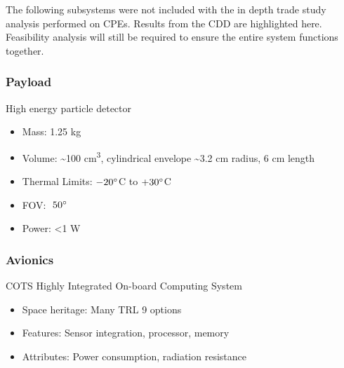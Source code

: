 The following subsystems were not included with the in depth trade study analysis performed on CPEs.  Results from the CDD are highlighted here.  Feasibility analysis will still be required to ensure the entire system functions together.

\subsubsection{Payload} High energy particle detector
\begin{itemize}
    \item Mass: 1.25 kg
    \item Volume: \textasciitilde100 cm\textsuperscript{3}, cylindrical envelope \textasciitilde3.2 cm radius, 6 cm length
    \item Thermal Limits: $-20\degree$C to $+30\degree$C
    \item FOV: $~50\degree$
    \item Power: <1 W
\end{itemize}

\subsubsection{Avionics}
COTS Highly Integrated On-board Computing System
\begin{itemize}[topsep=0pt]
    \item Space heritage: Many TRL 9 options
    \item Features: Sensor integration, processor, memory
    \item Attributes: Power consumption, radiation resistance
\end{itemize}

